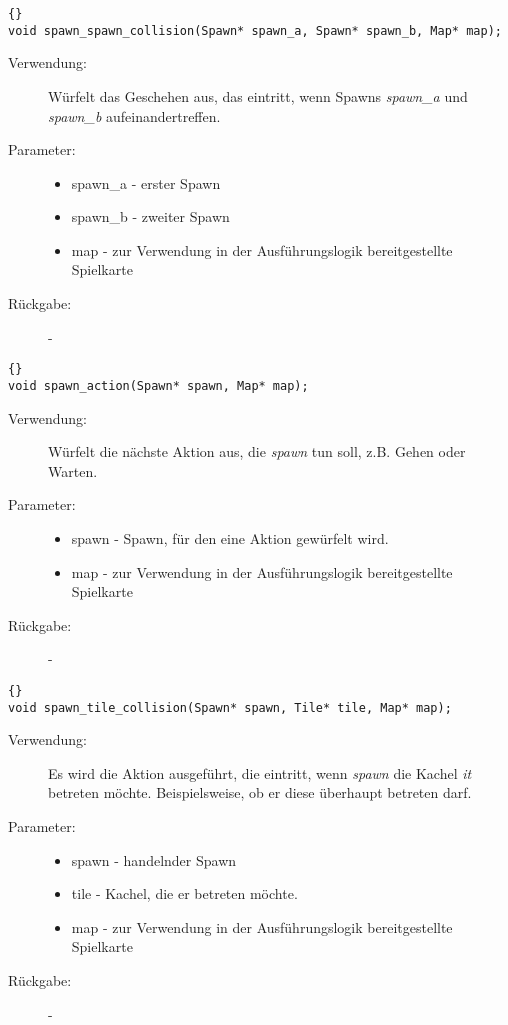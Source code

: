 \documentclass[11pt,a4paper,notitlepage]{report}
\begin{document}
	\begin{lstlisting}[caption=spawn\_spawn\_collision]{}
void spawn_spawn_collision(Spawn* spawn_a, Spawn* spawn_b, Map* map);
		\end{lstlisting}
		
	\begin{description}
		\item[Verwendung:] Würfelt das Geschehen aus, das eintritt, wenn Spawns \textit{spawn\_a} und \textit{spawn\_b} aufeinandertreffen.
		\item[Parameter:] \hfill
		\begin{itemize}
			\item spawn\_a - erster Spawn
			\item spawn\_b - zweiter Spawn
			\item map - zur Verwendung in der Ausführungslogik bereitgestellte Spielkarte
		\end{itemize}
		\item[Rückgabe:] -
	\end{description}
	
			\begin{lstlisting}[caption=spawn\_action]{}
void spawn_action(Spawn* spawn, Map* map);
		\end{lstlisting}
		
	\begin{description}
		\item[Verwendung:] Würfelt die nächste Aktion aus, die \textit{spawn} tun soll, z.B. Gehen oder Warten.
		\item[Parameter:] \hfill
		\begin{itemize}
			\item spawn - Spawn, für den eine Aktion gewürfelt wird.
			\item map - zur Verwendung in der Ausführungslogik bereitgestellte Spielkarte
		\end{itemize}
		\item[Rückgabe:] -
	\end{description}
	
	\begin{lstlisting}[caption=spawn\_tile\_collision]{}
void spawn_tile_collision(Spawn* spawn, Tile* tile, Map* map);
		\end{lstlisting}
		
	\begin{description}
		\item[Verwendung:] Es wird die Aktion ausgeführt, die eintritt, wenn \textit{spawn} die Kachel \textit{it} betreten möchte. Beispielsweise, ob er diese überhaupt betreten darf.
		\item[Parameter:] \hfill
		\begin{itemize}
			\item spawn - handelnder Spawn
			\item tile - Kachel, die er betreten möchte.
			\item map - zur Verwendung in der Ausführungslogik bereitgestellte Spielkarte
		\end{itemize}
		\item[Rückgabe:] -
	\end{description}
	
\end{document}
